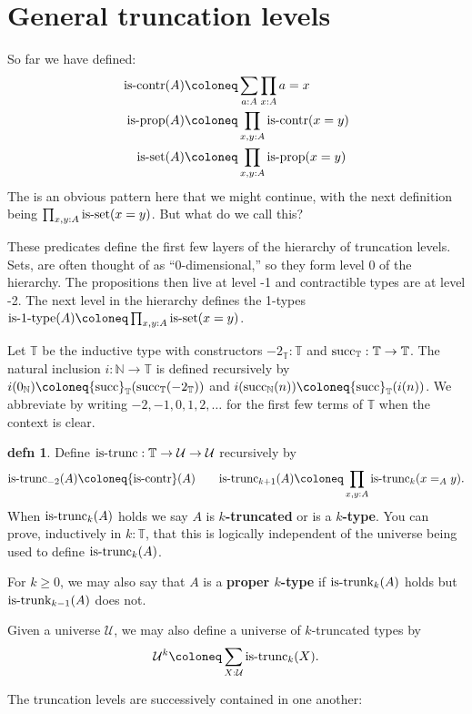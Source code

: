 \documentclass{amsart}
\theoremstyle{theorem}
\theoremstyle{definition}
\newtheorem*{defn}{defn}
\theoremstyle{remark}
\newcommand{\0}{\mathbbe{0}}
\newcommand{\1}{\mathbbe{1}}
\newcommand{\2}{\mathbbe{2}}
\newcommand{\3}{\mathbbe{3}}
\newcommand{\4}{\mathbbe{4}}
\newcommand{\term}[1]{{\textup{#1}}}
\newcommand{\type}[1]{{\textup{#1}}}
\newcommand{\bN}{{\mathbb{N}}}
\newcommand{\bT}{{\mathbb{T}}}
\newcommand{\suc}{\term{succ}_{\bN}}
\newcommand{\UU}{{\mathcal{U}}}
\newcommand{\is}[1]{\type{is-{#1}}}
\newcommand{\iscontr}{\type{is-contr}}
\newcommand{\isprop}{\type{is-prop}}
\begin{document}
\section*{General truncation levels}

So far we have defined:
\begin{align*}
\iscontr(A) &\coloneq \sum_{a:A} \prod_{x:A} a=x\\
\isprop(A) &\coloneq \prod_{x,y:A} \iscontr(x=y) \\
\is{set}(A) &\coloneq \prod_{x,y:A} \isprop(x=y)
\end{align*}
The is an obvious pattern here that we might continue, with the next definition being $\prod_{x,y:A} \is{set}(x=y)$. But what do we call this?

These predicates define the first few layers of the hierarchy of truncation levels. Sets, are often thought of as ``0-dimensional,'' so they form level 0 of the hierarchy. The propositions then live at level -1 and contractible types are at level -2. The next level in the hierarchy defines the 1-types $\is{1-type}(A) \coloneq\prod_{x,y:A} \is{set}(x=y)$.


Let $\bT$ be the inductive type with constructors $-2_\bT : \bT$ and $\term{succ}_\bT : \bT \to \bT$. The natural inclusion $i \colon \bN \to \bT$ is defined recursively by $i(0_\bN) \coloneq \term{succ}_\bT (\term{succ}_\bT (-2_\bT))$ and $i(\suc(n)) \coloneq \term{succ}_\bT (i(n))$. We abbreviate by writing $-2,-1,0,1,2,\ldots$ for the first few terms of $\bT$ when the context is clear.

\begin{defn} Define $\is{trunc} : \bT \to \UU \to \UU$ recursively by
\[ \is{trunc}_{-2}(A) \coloneq \iscontr(A) \qquad \is{trunc}_{k+1}(A) \coloneq \prod_{x,y:A} \is{trunc}_k(x=_Ay).\]
When $\is{trunc}_k(A)$ holds we say $A$ is \textbf{$k$-truncated} or is a \textbf{$k$-type}. You can prove, inductively in $k : \bT$, that this is logically independent of the universe being used to define $\is{trunc}_k(A)$.
\end{defn}



For $k \geq 0$, we may also say that $A$ is a \textbf{proper $k$-type} if $\is{trunk}_k(A)$ holds but $\is{trunk}_{k-1}(A)$ does not.



Given a universe $\UU$, we may also define a universe of $k$-truncated types by
\[ \UU^k \coloneq \sum_{X:\UU} \is{trunc}_k(X).\]


The truncation levels are successively contained in one another:
\end{document}
